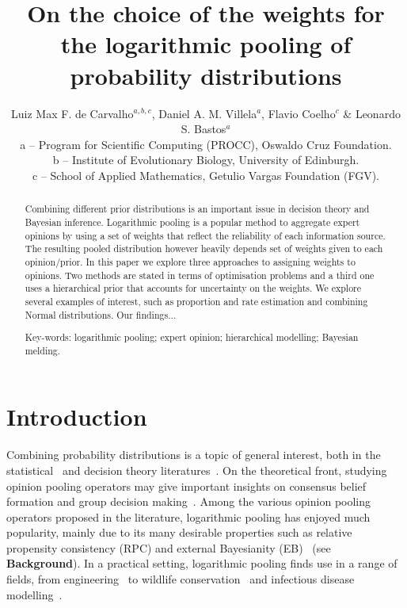 \documentclass[a4paper, notitlepage, 10pt]{article}
\title{\vspace{-9ex}\centering \bf On the choice of the weights for the logarithmic pooling of probability distributions}
\author{
Luiz Max F. de Carvalho$^{a,b,c}$, Daniel A. M. Villela$^a$, Flavio Coelho$^c$ \& Leonardo S. Bastos$^a$ \\
a -- Program for Scientific Computing (PROCC), Oswaldo Cruz Foundation. \\
b -- Institute of Evolutionary Biology, University of Edinburgh.\\
c -- School of Applied Mathematics, Getulio Vargas Foundation (FGV).
}
\begin{document}
\maketitle

\begin{abstract}
Combining different prior distributions is an important issue in decision theory and Bayesian inference.
Logarithmic pooling is a popular method to aggregate expert opinions by using a set of weights that reflect the reliability of each information source.
The resulting pooled distribution however heavily depends set of weights given to each opinion/prior.
In this paper we explore three approaches to assigning weights to opinions.
Two methods are stated in terms of optimisation problems and a third one uses a hierarchical prior that accounts for uncertainty on the weights. 
We explore several examples of interest, such as proportion and rate estimation and combining Normal distributions.
Our findings...

Key-words: logarithmic pooling; expert opinion; hierarchical modelling; Bayesian melding. 
\end{abstract}

\section{Introduction}
\label{sec:intro}

Combining probability distributions is a topic of general interest, both in the statistical~\citep{west1984, genest1986A, genest1986B} and decision theory literatures~\citep{genest1984}.
On the theoretical front, studying opinion pooling operators may give important insights on consensus belief formation and group decision making~\citep{west1984,genest1986B}.
Among the various opinion pooling operators proposed in the literature, logarithmic pooling has enjoyed much popularity, mainly due to its many desirable properties such as relative propensity consistency (RPC) and external Bayesianity (EB)~\citep{genest1986A} (see \textbf{Background}). 
In a practical setting, logarithmic pooling finds use in a range of fields, from engineering~\citep{lind1988, savchuk1994} to wildlife conservation~\citep{poole2000} and infectious disease modelling~\citep{Coelho2009}. %
\end{document}
